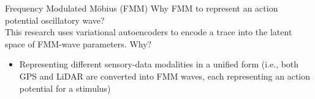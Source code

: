\begin{frame}[allowframebreaks]{Frequency Modulated M\"obius (FMM)}
        \alert{Why FMM to represent an action potential oscillatory wave?}\\
        This research uses variational autoencoders to encode a trace into the latent space of FMM-wave parameters. Why?
        \begin{itemize}
            \item Representing different sensory-data modalities in a unified form (i.e., both GPS and LiDAR are converted into FMM waves, each representing an action potential for a stimulus)
        \end{itemize}
        
    \end{frame}